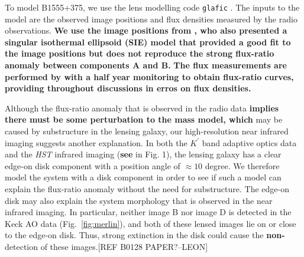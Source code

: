 \documentclass[useAMS,usenatbib]{mn2e}
\begin{document}
To model B1555+375, we use the lens modelling code {\tt glafic}
\citep{Oguri}.  The inputs to the model are the observed image
positions and flux densities measured by the radio observations.
\textbf{We use the image positions from \citet{Marlow99}, who also presented a singular isothermal ellipsoid
(SIE) model that provided a good fit to the image positions but
does not reproduce the strong flux-ratio anomaly between components A
and B.}  %
\textbf{The flux measurements are performed by \citet{K03} with a half year monitoring to obtain flux-ratio curves, providing throughout discussions in erros on flux densities.}

Although the flux-ratio anomaly that is observed in the radio data \textbf{implies there must be some perturbation to the mass model, which} may be
caused by substructure in the lensing galaxy, our high-resolution near
infrared imaging suggests another explanation.  In both the $K^\prime$
band adaptive optics data and the \textit{HST} infrared imaging (\textbf{see} in
Fig. 1), the lensing galaxy has a clear edge-on disk component with a
position angle of $\approx 10$ degree.  We therefore model the system
with a disk component in order to see if such a model can explain the
flux-ratio anomaly without the need for substructure.  The edge-on
disk may also explain the system morphology that is observed in the
near infrared imaging.  In particular, neither image B nor image D is
detected in the Keck AO data (Fig.~\ref{fig:merlin}), and both of
these lensed images lie on or close to the edge-on disk.  Thus, strong
extinction in the disk could cause the \textbf{non-}detection of these
images.[REF B0128 PAPER?--LEON]
\end{document}
